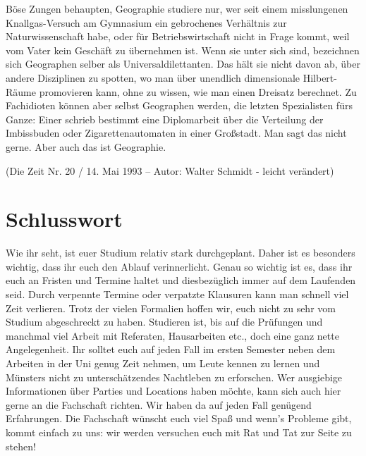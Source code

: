 Böse Zungen behaupten, Geographie studiere nur, wer seit einem misslungenen Knallgas-Versuch am Gymnasium ein gebrochenes Verhältnis zur Naturwissenschaft habe, oder für Betriebswirtschaft nicht in Frage kommt, weil vom Vater kein Geschäft zu übernehmen ist. Wenn sie unter sich sind, bezeichnen sich Geographen selber als Universaldilettanten. Das hält sie nicht davon ab, über andere Disziplinen zu spotten, wo man über unendlich dimensionale Hilbert-Räume promovieren kann, ohne zu wissen, wie man einen Dreisatz berechnet. Zu Fachidioten können aber selbst Geographen werden, die letzten Spezialisten fürs Ganze: Einer schrieb bestimmt eine Diplomarbeit über die Verteilung der Imbissbuden oder Zigarettenautomaten in einer Großstadt. Man sagt das nicht gerne. Aber auch das ist Geographie. 

(Die Zeit Nr. 20 / 14. Mai 1993 – Autor: Walter Schmidt - leicht verändert)

\section*{Schlusswort}
Wie ihr seht, ist euer Studium relativ stark durchgeplant. Daher ist es besonders wichtig, dass ihr euch den Ablauf verinnerlicht. Genau so wichtig ist es, dass ihr euch an Fristen und Termine haltet und diesbezüglich immer auf dem Laufenden seid. Durch verpennte Termine oder verpatzte Klausuren kann man schnell viel Zeit verlieren. Trotz der vielen Formalien hoffen wir, euch nicht zu sehr vom Studium abgeschreckt zu haben. Studieren ist, bis auf die Prüfungen und manchmal viel Arbeit mit Referaten, Hausarbeiten etc., doch eine ganz nette Angelegenheit. Ihr solltet euch auf jeden Fall im ersten Semester neben dem Arbeiten in der Uni genug Zeit nehmen, um Leute kennen zu lernen und Münsters nicht zu unterschätzendes Nachtleben zu erforschen. Wer ausgiebige Informationen über Parties und Locations haben möchte, kann sich auch hier gerne an die Fachschaft richten. Wir haben da auf jeden Fall genügend Erfahrungen. 
Die Fachschaft wünscht euch viel Spaß und wenn’s Probleme gibt, kommt einfach zu uns: wir werden versuchen euch mit Rat und Tat zur Seite zu stehen!
